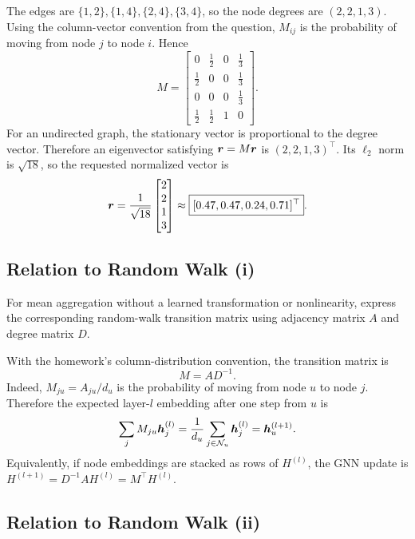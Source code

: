 \begin{solution}
The edges are
$\{1,2\},\{1,4\},\{2,4\},\{3,4\}$, so the node degrees are
$(2,2,1,3)$.  Using the column-vector convention from the question,
$M_{ij}$ is the probability of moving from node $j$ to node $i$.  Hence
\[
  M=
  \begin{bmatrix}
    0           & \tfrac12 & 0 & \tfrac13 \\
    \tfrac12    & 0        & 0 & \tfrac13 \\
    0           & 0        & 0 & \tfrac13 \\
    \tfrac12    & \tfrac12 & 1 & 0
  \end{bmatrix}.
\]
For an undirected graph, the stationary vector is proportional to the degree
vector.  Therefore an eigenvector satisfying $\bm{r}=M\bm{r}$ is
$(2,2,1,3)^\top$.  Its $\ell_2$ norm is $\sqrt{18}$, so the requested
normalized vector is
\[
  \bm{r}
  =\frac{1}{\sqrt{18}}
    \begin{bmatrix}2\\2\\1\\3\end{bmatrix}
  \approx
    \boxed{[0.47,0.47,0.24,0.71]^\top}.
\]
\end{solution}

\subsection{Relation to Random Walk (i)}

For mean aggregation without a learned transformation or nonlinearity, express
the corresponding random-walk transition matrix using adjacency matrix $A$ and
degree matrix $D$.

\begin{solution}
With the homework's column-distribution convention, the transition matrix is
\[
  \boxed{M=AD^{-1}}.
\]
Indeed, $M_{ju}=A_{ju}/d_u$ is the probability of moving from node $u$ to
node $j$.  Therefore the expected layer-$l$ embedding after one step from
$u$ is
\[
  \sum_j M_{ju}\bm{h}_j^{(l)}
  =\frac{1}{d_u}\sum_{j\in\mathcal N_u}\bm{h}_j^{(l)}
  =\bm{h}_u^{(l+1)}.
\]
Equivalently, if node embeddings are stacked as rows of $H^{(l)}$, the GNN
update is $H^{(l+1)}=D^{-1}AH^{(l)}=M^\top H^{(l)}$.
\end{solution}

\subsection{Relation to Random Walk (ii)}

